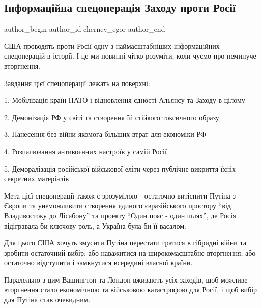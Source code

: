  
 
 
 
 
 
\subsection{Інформаційна спецоперація Заходу проти Росії}
\label{sec:12_02_2022.fb.chernev_egor.1.inf_operacia_zapad_rossia}
 
\ifcmt
 author_begin
   author_id chernev_egor
 author_end
\fi

США проводять проти Росії одну з наймасштабніших інформаційних спецоперацій в
історії. І це ми повинні чітко розуміти, коли чуємо про неминуче вторгнення. 

Завдання цієї спецоперації лежать на поверхні: 

1. Мобілізація країн НАТО і відновлення єдності Альянсу та Заходу в цілому

2. Демонізація РФ у світі та створення їй стійкого токсичного образу

3. Нанесення без війни якомога більших втрат для економіки РФ

4. Розпалювання антивоєнних настроїв у самій Росії

5. Деморалізація російської військової еліти через публічне викриття їхніх
секретних матеріалів 

Мета цієї спецоперації також є зрозумілою - остаточно витіснити Путіна з Європи
та унеможливити створення єдиного євразійського простору \enquote{від Владивостоку до
Лісабону} та проекту \enquote{Один пояс - один шлях}, де Росія відігравала би ключову
роль, а Україна була би її васалом. 

Для цього США хочуть змусити Путіна перестати гратися в гібридні війни та
зробити остаточний вибір: або наважитися на широкомасштабне вторгнення, або
остаточно відступити і замкнутися всередині власної країни. 

Паралельно з цим Вашингтон та Лондон вживають усіх заходів, щоб можливе
вторгнення стало економічною та військовою катастрофою для Росії, і щоб вибір
для Путіна став очевидним. 

